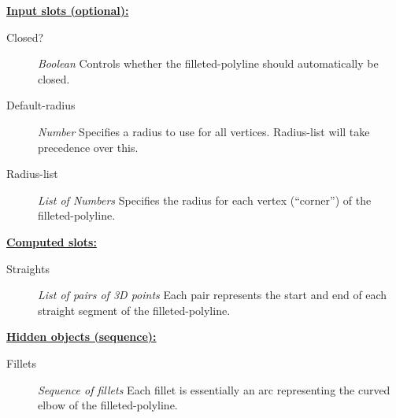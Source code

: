 \documentclass [11pt]{book}
\begin{document}
\begin{itemize}
\begin{description}
\end{description}






\textbf{
\underline{Input slots (optional):}}

\begin{description}

\item [Closed?]
\emph{Boolean} Controls whether the filleted-polyline should automatically be closed.


\item [Default-radius]
\emph{Number} Specifies a radius to use for all vertices. Radius-list will take precedence over this.


\item [Radius-list]
\emph{List of Numbers} Specifies the radius for each vertex (``corner'') of the filleted-polyline.


\end{description}






\textbf{
\underline{Computed slots:}}

\begin{description}

\item [Straights]
\emph{List of pairs of 3D points} Each pair represents the start and end of each straight segment of the
filleted-polyline.


\end{description}






\textbf{
\underline{Hidden objects (sequence):}}

\begin{description}

\item [Fillets]
\emph{Sequence of fillets} Each fillet is essentially an arc representing the curved elbow
of the filleted-polyline.


\end{description}








\end{itemize}
\end{document}
